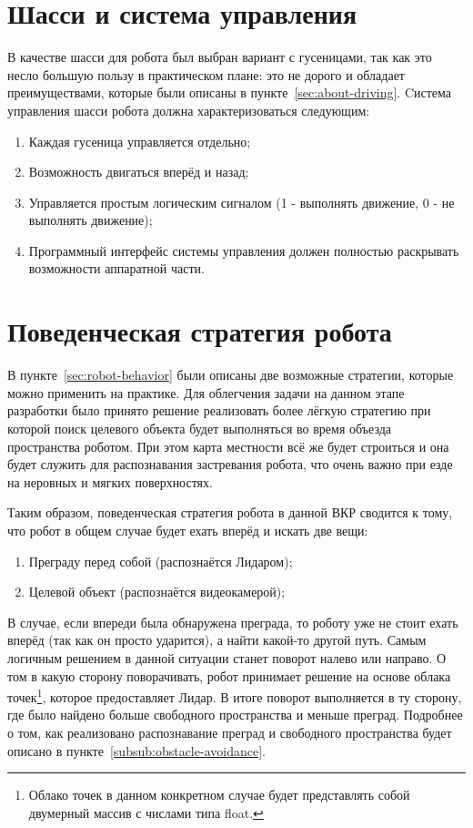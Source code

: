 \section{Шасси и система управления}
В качестве шасси для робота был выбран вариант с гусеницами, так как это несло большую пользу в практическом плане: это не дорого и обладает преимуществами, которые были описаны в пункте~\ref{sec:about-driving}.
Cистема управления шасси робота должна характеризоваться следующим:
\begin{enumerate}
\item Каждая гусеница управляется отдельно;
\item Возможность двигаться вперёд и назад;
\item Управляется простым логическим сигналом (1 - выполнять движение, 0 - не выполнять движение);
\item Программный интерфейс системы управления должен полностью раскрывать возможности аппаратной части.
\end{enumerate}

\section{Поведенческая стратегия робота}
В пункте~\ref{sec:robot-behavior} были описаны две возможные стратегии, которые можно применить на практике. Для облегчения задачи на данном этапе разработки было принято решение реализовать более лёгкую стратегию при которой поиск целевого объекта будет выполняться во время объезда пространства роботом. При этом карта местности всё же будет строиться и она будет служить для распознавания застревания робота, что очень важно при езде на неровных и мягких поверхностях.

Таким образом, поведенческая стратегия робота в данной ВКР сводится к тому, что робот в общем случае будет ехать вперёд и искать две вещи:
\begin{enumerate}
\item Преграду перед собой (распознаётся Лидаром);
\item Целевой объект (распознаётся видеокамерой);
\end{enumerate} 

В случае, если впереди была обнаружена преграда, то роботу уже не стоит ехать вперёд (так как он просто ударится), а найти какой-то другой путь. Самым логичным решением в данной ситуации станет поворот налево или направо. О том в какую сторону поворачивать, робот принимает решение на основе облака точек\footnote{Облако точек в данном конкретном случае будет представлять собой двумерный массив с числами типа float.}, которое предоставляет Лидар. В итоге поворот выполняется в ту сторону, где было найдено больше свободного пространства и меньше преград. Подробнее о том, как реализовано распознавание преград и свободного пространства будет описано в пункте~\ref{subsub:obstacle-avoidance}.

